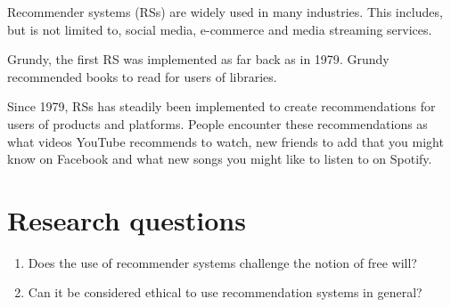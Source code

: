 
Recommender systems (RSs) are widely used in many industries. This includes, but is not limited to, social media, e-commerce and media streaming services.

Grundy, the first RS was implemented as far back as in 1979\parencite{nurul_qomariyah_definition_nodate}. Grundy recommended books to read for users of libraries.

Since 1979, RSs has steadily been implemented to create recommendations for users of products and platforms. People encounter these recommendations as what videos YouTube recommends to watch, new friends to add that you might know on Facebook and what new songs you might like to listen to on Spotify.

\section{Research questions}

\begin{enumerate}
    \item Does the use of recommender systems challenge the notion of free will?
    \item Can it be considered ethical to use recommendation systems in general?
\end{enumerate}